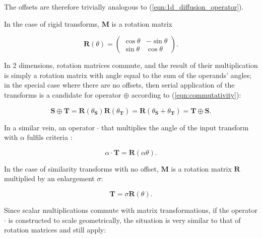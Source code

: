 		The offsets are therefore trivially analogous to (\ref{eqn:1d_diffusion_operator}).
		
		In the case of rigid transforms, $\mathbf{M}$ is a rotation matrix
		
		\begin{equation}
			\mathbf{R}(\theta) = \left( \begin{matrix}
			  										 \cos \theta & -\sin\theta \\
														 \sin\theta & \cos\theta
					                 \end{matrix} \right) .
		\end{equation}
		
		In 2 dimensions, rotation matrices commute, and the result of their multiplication is simply a rotation matrix with angle equal to the sum of the operands' angles; in the special case where there are no offsets, then serial application of the transforms is a candidate for operator $\oplus$ according to (\ref{eqn:commutativity}):
		
		\begin{equation}
			\mathbf{S} \oplus \mathbf{T} = \mathbf{R}(\theta_\mathbf{S})\mathbf{R}(\theta_\mathbf{T}) = \mathbf{R}(\theta_\mathbf{S} + \theta_\mathbf{T}) = \mathbf{T} \oplus \mathbf{S}.
		\end{equation}
		
		
		In a similar vein, an operator $\cdot$ that multiplies the angle of the input transform with $\alpha$ fulfils criteria :
    
    \begin{equation}
      \alpha \cdot \mathbf{T} = \mathbf{R}(\alpha\theta).
    \end{equation}
		
        In the case of similarity transforms with no offset, $\mathbf{M}$ is a rotation matrix $\mathbf{R}$ multiplied by an enlargement $\sigma$:
        
        \begin{equation}
            \mathbf{T} = \sigma\mathbf{R}(\theta).
        \end{equation}
        
        Since scalar multiplications commute with matrix transformations, if the operator $\cdot$ is constructed to scale geometrically, the situation is very similar to that of rotation matrices and  still apply:
        
